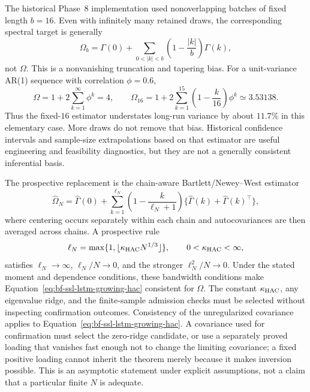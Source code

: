 The historical Phase~8 implementation used nonoverlapping batches of fixed
length $b=16$.  Even with infinitely many retained draws, the corresponding
spectral target is generally
\begin{equation}
  \Omega_b
  =\Gamma(0)+\sum_{0<|k|<b}
    \left(1-\frac{|k|}{b}\right)\Gamma(k),
  \label{eq:bf-ssl-lstm-fixed-batch-limit}
\end{equation}
not $\Omega$.  This is a nonvanishing truncation and tapering bias.  For a
unit-variance AR(1) sequence with correlation $\phi=0.6$,
\begin{equation}
  \Omega=1+2\sum_{k=1}^{\infty}\phi^k=4,
  \qquad
  \Omega_{16}=1+2\sum_{k=1}^{15}
       \left(1-\frac{k}{16}\right)\phi^k
       \simeq3.53138.
  \label{eq:bf-ssl-lstm-fixed-batch-counterexample}
\end{equation}
Thus the fixed-$16$ estimator understates long-run variance by about $11.7\%$
in this elementary case.  More draws do not remove that bias.  Historical
confidence intervals and sample-size extrapolations based on that estimator
are useful engineering and feasibility diagnostics, but they are not a
generally consistent inferential basis.

The prospective replacement is the chain-aware Bartlett/Newey--West estimator
\citep{neweywest1987,flegal2010batchmeans}
\begin{equation}
  \widehat\Omega_N
  =\widehat\Gamma(0)+\sum_{k=1}^{\ell_N}
    \left(1-\frac{k}{\ell_N+1}\right)
    \{\widehat\Gamma(k)+\widehat\Gamma(k)^\top\},
  \label{eq:bf-ssl-lstm-growing-hac}
\end{equation}
where centering occurs separately within each chain and autocovariances are
then averaged across chains.  A prospective rule
\begin{equation}
  \ell_N=\max\{1,\lfloor\kappa_{\rm HAC}N^{1/3}\rfloor\},
  \qquad 0<\kappa_{\rm HAC}<\infty,
  \label{eq:bf-ssl-lstm-hac-bandwidth}
\end{equation}
satisfies $\ell_N\rightarrow\infty$, $\ell_N/N\rightarrow0$, and the stronger
$\ell_N^2/N\rightarrow0$.  Under the
stated moment and dependence conditions, these bandwidth conditions make
Equation~\eqref{eq:bf-ssl-lstm-growing-hac} consistent for $\Omega$.  The
constant $\kappa_{\rm HAC}$, any eigenvalue ridge, and the finite-sample
admission checks must be selected without inspecting confirmation outcomes.
Consistency of the unregularized covariance applies to
Equation~\eqref{eq:bf-ssl-lstm-growing-hac}.  A covariance used for confirmation
must select the zero-ridge candidate, or use a separately proved loading that
vanishes fast enough not to change the limiting covariance; a fixed positive
loading cannot inherit the theorem merely because it makes inversion possible.
This is an asymptotic statement under explicit assumptions, not a claim that a
particular finite $N$ is adequate.

